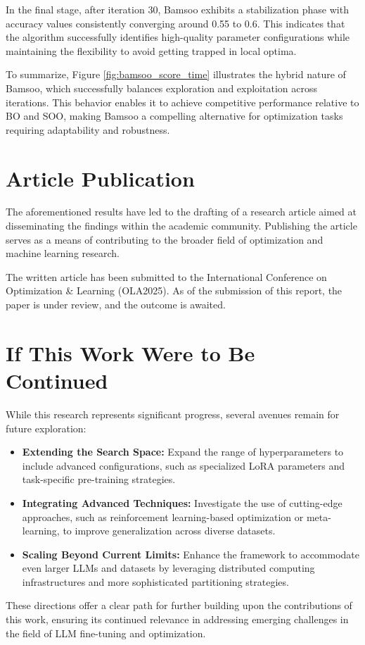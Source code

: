 In the final stage, after iteration 30, Bamsoo exhibits a stabilization phase with accuracy values consistently converging around 0.55 to 0.6. This indicates that the algorithm successfully identifies high-quality parameter configurations while maintaining the flexibility to avoid getting trapped in local optima.

To summarize, Figure \ref{fig:bamsoo_score_time} illustrates the hybrid nature of Bamsoo, which successfully balances exploration and exploitation across iterations. This behavior enables it to achieve competitive performance relative to BO and SOO, making Bamsoo a compelling alternative for optimization tasks requiring adaptability and robustness.


\section{Article Publication}
\label{sec:article}
The aforementioned results have led to the drafting of a research article aimed at disseminating the findings within the academic community. Publishing the article serves as a means of contributing to the broader field of optimization and machine learning research.

The written article has been submitted to the International Conference on Optimization \& Learning (OLA2025). As of the submission of this report, the paper is under review, and the outcome is awaited.

\section{If This Work Were to Be Continued}
\label{sec:further_work}
While this research represents significant progress, several avenues remain for future exploration:
\begin{itemize}
    \item \textbf{Extending the Search Space:} Expand the range of hyperparameters to include advanced configurations, such as specialized LoRA parameters and task-specific pre-training strategies.
    \item \textbf{Integrating Advanced Techniques:} Investigate the use of cutting-edge approaches, such as reinforcement learning-based optimization or meta-learning, to improve generalization across diverse datasets.
    \item \textbf{Scaling Beyond Current Limits:} Enhance the framework to accommodate even larger LLMs and datasets by leveraging distributed computing infrastructures and more sophisticated partitioning strategies.
\end{itemize}

These directions offer a clear path for further building upon the contributions of this work, ensuring its continued relevance in addressing emerging challenges in the field of LLM fine-tuning and optimization.
